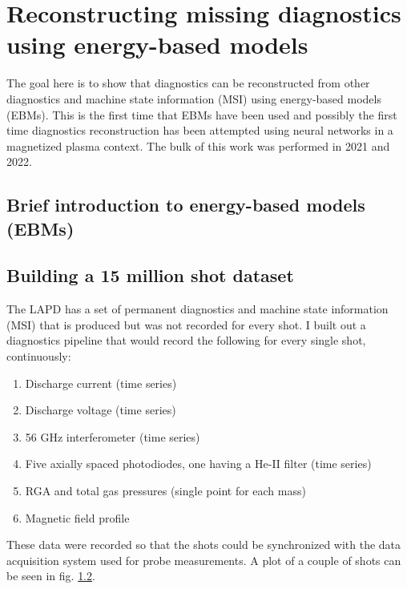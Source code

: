 \graphicspath{{../Thesis/Chapters/Chapter_ebm/}}

\chapter{Reconstructing missing diagnostics using energy-based models}

The goal here is to show that diagnostics can be reconstructed from other diagnostics and machine state information (MSI) using energy-based models (EBMs). This is the first time that EBMs have been used and possibly the first time diagnostics reconstruction has been attempted using neural networks in a magnetized plasma context. The bulk of this work was performed in 2021 and 2022.  

\section{Brief introduction to energy-based models (EBMs)}

\section{Building a 15 million shot dataset}

The LAPD has a set of permanent diagnostics and machine state information (MSI) that is produced but was not recorded for every shot. I built out a diagnostics pipeline that would record the following for every single shot, continuously:
\begin{enumerate}
	\item Discharge current (time series)
	\item Discharge voltage (time series)
	\item 56 GHz interferometer (time series)
	\item Five axially spaced photodiodes, one having a He-II filter (time series)
	\item RGA and total gas pressures (single point for each mass)
	\item Magnetic field profile
\end{enumerate}
These data were recorded so that the shots could be synchronized with the data acquisition system used for probe measurements. A plot of a couple of shots can be seen in fig. \ref{}.

